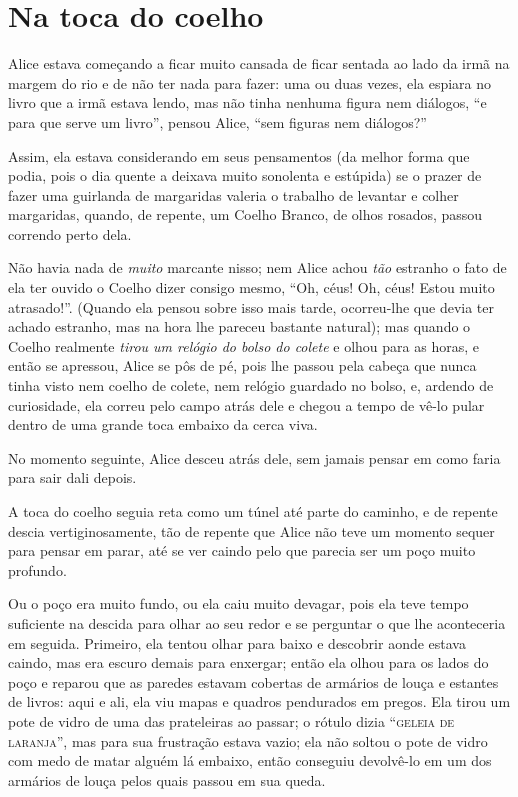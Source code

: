 
\chapter{Na toca do coelho}
\pagestyle{baruch}

Alice estava começando a ficar muito cansada de ficar sentada ao lado da
irmã na margem do rio e de não ter nada para fazer: uma ou duas vezes,
ela espiara no livro que a irmã estava lendo, mas não tinha
nenhuma figura nem diálogos, ``e para que serve um livro'', pensou
Alice, ``sem figuras nem diálogos?'' \label{ref1}

Assim, ela estava considerando em seus pensamentos (da melhor forma que
podia, pois o dia quente a deixava muito sonolenta e estúpida) se o
prazer de fazer uma guirlanda de margaridas valeria o trabalho de
levantar e colher margaridas, quando, de repente, um Coelho Branco, de
olhos rosados, passou correndo perto dela.

Não havia nada de \emph{muito} marcante nisso; nem Alice achou
\emph{tão} estranho o fato de ela ter ouvido o Coelho dizer consigo
mesmo, ``Oh, céus! Oh, céus! Estou muito atrasado!''. (Quando ela pensou
sobre isso mais tarde, ocorreu-lhe que devia ter achado estranho,
mas na hora lhe pareceu bastante natural); mas quando o Coelho \label{ref2}
realmente \emph{tirou um relógio do bolso do colete} e olhou para as
horas, e então se apressou, Alice se pôs de pé, pois lhe passou pela
cabeça que nunca tinha visto nem coelho de colete, nem relógio guardado
no bolso, e, ardendo de curiosidade, ela correu pelo campo atrás dele e
chegou a tempo de vê-lo pular dentro de uma grande toca embaixo da
cerca viva.

No momento seguinte, Alice desceu atrás dele, sem jamais pensar em como
faria para sair dali depois.

A toca do coelho seguia reta como um túnel até parte do caminho, e de
repente descia vertiginosamente, tão de repente que Alice não teve um
momento sequer para pensar em parar, até se ver caindo pelo que parecia ser um
poço muito profundo.

Ou o poço era muito fundo, ou ela caiu muito devagar, pois ela teve
tempo suficiente na descida para olhar ao seu redor e se perguntar o
que lhe aconteceria em seguida. Primeiro, ela tentou olhar para baixo e
descobrir aonde estava caindo, mas era escuro demais para enxergar;
então ela olhou para os lados do poço e reparou que as paredes estavam
cobertas de armários de louça e estantes de livros: aqui e ali, ela viu
mapas e quadros pendurados em pregos. Ela tirou um pote de vidro de uma
das prateleiras ao passar; o rótulo dizia ``\textsc{geleia de laranja}'', mas
para sua frustração estava vazio; ela não soltou o pote de vidro com
medo de matar alguém lá embaixo, então conseguiu devolvê-lo em um dos
armários de louça pelos quais passou em sua queda.

